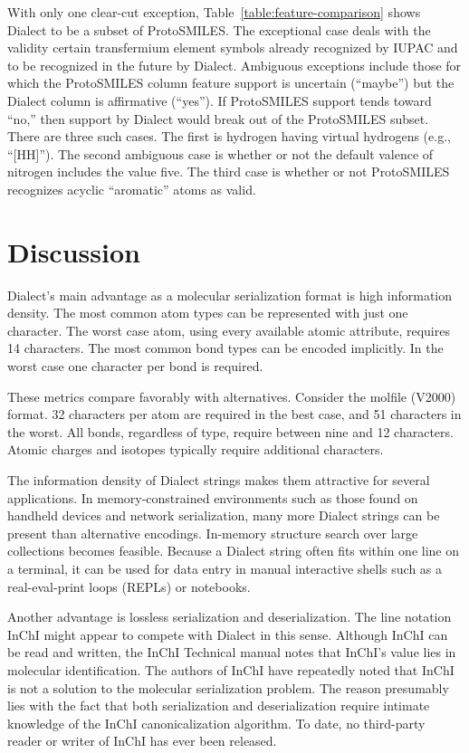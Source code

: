 \documentclass{article}
\begin{document}
With only one clear-cut exception, Table~\ref{table:feature-comparison} shows Dialect to be a subset of ProtoSMILES. The exceptional case deals with the validity certain transfermium element symbols already recognized by IUPAC and to be recognized in the future by Dialect. Ambiguous exceptions include those for which the ProtoSMILES column feature support is uncertain (\enquote{maybe}) but the Dialect column is affirmative (\enquote{yes}). If ProtoSMILES support tends toward \enquote{no,} then support by Dialect would break out of the ProtoSMILES subset. There are three such cases. The first is hydrogen having virtual hydrogens (e.g., \enquote{[HH]}). The second ambiguous case is whether or not the default valence of nitrogen includes the value five. The third case is whether or not ProtoSMILES recognizes acyclic \enquote{aromatic} atoms as valid.

\section*{Discussion}

Dialect's main advantage as a molecular serialization format is high information density. The most common atom types can be represented with just one character. The worst case atom, using every available atomic attribute, requires 14 characters. The most common bond types can be encoded implicitly. In the worst case one character per bond is required.

These metrics compare favorably with alternatives. Consider the molfile (V2000) format. 32 characters per atom are required in the best case, and 51 characters in the worst. All bonds, regardless of type, require between nine and 12 characters. Atomic charges and isotopes typically require additional characters.

The information density of Dialect strings makes them attractive for several applications. In memory-constrained environments such as those found on handheld devices and network serialization, many more Dialect strings can be present than alternative encodings. In-memory structure search over large collections becomes feasible. Because a Dialect string often fits within one line on a terminal, it can be used for data entry in manual interactive shells such as a real-eval-print loops (REPLs) or notebooks.

Another advantage is lossless serialization and deserialization. The line notation InChI might appear to compete with Dialect in this sense. Although InChI can be read and written, the InChI Technical manual notes that InChI's value lies in molecular identification. The authors of InChI have repeatedly noted that InChI is not a solution to the molecular serialization problem. The reason presumably lies with the fact that both serialization and deserialization require intimate knowledge of the InChI canonicalization algorithm. To date, no third-party reader or writer of InChI has ever been released.
\end{document}
